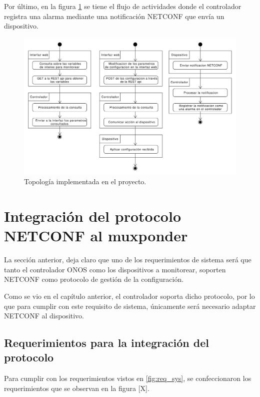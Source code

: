   Por último, en la figura \ref{fig:actividad_config} se tiene el flujo de actividades donde el controlador registra una alarma mediante una notificación NETCONF que envía un dispositivo.


  \begin{figure}[H]
    \centering
    \includegraphics[scale=0.40]{Figures/actividad_config.pdf}
    \caption{Topología implementada en el proyecto.}
    \label{fig:actividad_config}
  \end{figure}


  \section{Integración del protocolo NETCONF al muxponder}
  La sección anterior, deja claro que uno de los requerimientos de sistema será que tanto el controlador ONOS como los dispositivos a monitorear, soporten NETCONF como protocolo de gestión de la configuración. 
  
  Como se vio en el capítulo anterior, el controlador soporta dicho protocolo, por lo que para cumplir con este requisito de sistema, únicamente será necesario adaptar NETCONF al dispositivo. 
  
  \subsection{Requerimientos para la integración del protocolo}

  Para cumplir con los requerimientos vistos en \ref{fig:req_sys}, se confeccionaron los requerimientos que se observan en la figura [X].

